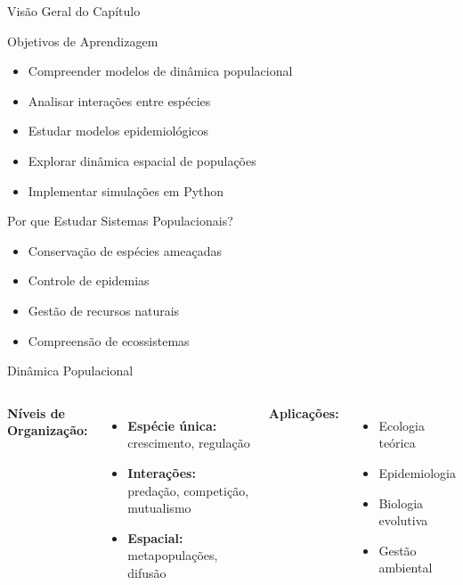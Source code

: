 \begin{frame}{Visão Geral do Capítulo}
\begin{block}{Objetivos de Aprendizagem}
\begin{itemize}
    \item Compreender modelos de dinâmica populacional
    \item Analisar interações entre espécies
    \item Estudar modelos epidemiológicos
    \item Explorar dinâmica espacial de populações
    \item Implementar simulações em Python
\end{itemize}
\end{block}

\vspace{0.3cm}

\begin{exampleblock}{Por que Estudar Sistemas Populacionais?}
\begin{itemize}
    \item Conservação de espécies ameaçadas
    \item Controle de epidemias
    \item Gestão de recursos naturais
    \item Compreensão de ecossistemas
\end{itemize}
\end{exampleblock}
\end{frame}

\begin{frame}{Dinâmica Populacional}

\vspace{0.3cm}

\begin{columns}
\textbf{Níveis de Organização:}
\begin{itemize}
    \item \textbf{Espécie única:} crescimento, regulação
    \item \textbf{Interações:} predação, competição, mutualismo
    \item \textbf{Espacial:} metapopulações, difusão
\end{itemize}

\textbf{Aplicações:}
\begin{itemize}
    \item Ecologia teórica
    \item Epidemiologia
    \item Biologia evolutiva
    \item Gestão ambiental
\end{itemize}
\end{columns}
\end{frame}

